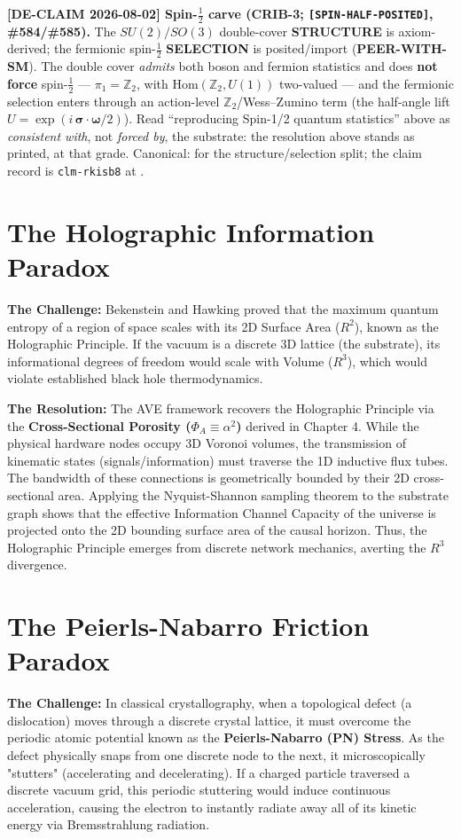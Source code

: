 \noindent\textbf{[DE-CLAIM 2026-08-02] Spin-$\frac{1}{2}$ carve (CRIB-3; \texttt{[SPIN-HALF-POSITED]}, \#584/\#585).} The $SU(2)/SO(3)$ double-cover \textbf{STRUCTURE} is axiom-derived; the fermionic spin-$\frac{1}{2}$ \textbf{SELECTION} is posited/import (\textbf{PEER-WITH-SM}). The double cover \emph{admits} both boson and fermion statistics and does \textbf{not force} spin-$\frac{1}{2}$ --- $\pi_1 = \mathbb{Z}_2$, with $\mathrm{Hom}(\mathbb{Z}_2, U(1))$ two-valued --- and the fermionic selection enters through an action-level $\mathbb{Z}_2$/Wess--Zumino term (the half-angle lift $U = \exp(i\,\boldsymbol{\sigma}\cdot\boldsymbol{\omega}/2)$). Read ``reproducing Spin-1/2 quantum statistics'' above as \emph{consistent with}, not \emph{forced by}, the substrate: the resolution above stands as printed, at that grade. Canonical:  for the structure/selection split; the claim record is \texttt{clm-rkisb8} at .

\section{The Holographic Information Paradox}
\textbf{The Challenge:} Bekenstein and Hawking proved that the maximum quantum entropy of a region of space scales with its 2D Surface Area ($R^2$), known as the Holographic Principle. If the vacuum is a discrete 3D lattice (the substrate), its informational degrees of freedom would scale with Volume ($R^3$), which would violate established black hole thermodynamics.

\textbf{The Resolution:} The AVE framework recovers the Holographic Principle via the \textbf{Cross-Sectional Porosity ($\Phi_A \equiv \alpha^2$)} derived in Chapter 4. While the physical hardware nodes occupy 3D Voronoi volumes, the transmission of kinematic states (signals/information) must traverse the 1D inductive flux tubes. The bandwidth of these connections is geometrically bounded by their 2D cross-sectional area. Applying the Nyquist-Shannon sampling theorem to the substrate graph shows that the effective Information Channel Capacity of the universe is projected onto the 2D bounding surface area of the causal horizon. Thus, the Holographic Principle emerges from discrete network mechanics, averting the $R^3$ divergence.

\section{The Peierls-Nabarro Friction Paradox}
\textbf{The Challenge:} In classical crystallography, when a topological defect (a dislocation) moves through a discrete crystal lattice, it must overcome the periodic atomic potential known as the \textbf{Peierls-Nabarro (PN) Stress}. As the defect physically snaps from one discrete node to the next, it microscopically "stutters" (accelerating and decelerating). If a charged particle traversed a discrete vacuum grid, this periodic stuttering would induce continuous acceleration, causing the electron to instantly radiate away all of its kinetic energy via Bremsstrahlung radiation.

